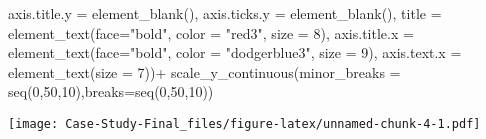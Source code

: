 \documentclass[
]{article}
\newenvironment{Shaded}{\begin{snugshade}}{\end{snugshade}}
\newcommand{\AttributeTok}[1]{\textcolor[rgb]{0.77,0.63,0.00}{#1}}
\newcommand{\DecValTok}[1]{\textcolor[rgb]{0.00,0.00,0.81}{#1}}
\newcommand{\FunctionTok}[1]{\textcolor[rgb]{0.00,0.00,0.00}{#1}}
\newcommand{\NormalTok}[1]{#1}
\newcommand{\SpecialCharTok}[1]{\textcolor[rgb]{0.00,0.00,0.00}{#1}}
\newcommand{\StringTok}[1]{\textcolor[rgb]{0.31,0.60,0.02}{#1}}
\begin{document}
\begin{Shaded}
\begin{Highlighting}[]
        \AttributeTok{axis.title.y =} \FunctionTok{element\_blank}\NormalTok{(),}
        \AttributeTok{axis.ticks.y =} \FunctionTok{element\_blank}\NormalTok{(),}
        \AttributeTok{title =} \FunctionTok{element\_text}\NormalTok{(}\AttributeTok{face=}\StringTok{"bold"}\NormalTok{, }\AttributeTok{color =} \StringTok{"red3"}\NormalTok{, }\AttributeTok{size =} \DecValTok{8}\NormalTok{),}
        \AttributeTok{axis.title.x =} \FunctionTok{element\_text}\NormalTok{(}\AttributeTok{face=}\StringTok{"bold"}\NormalTok{, }\AttributeTok{color =} \StringTok{"dodgerblue3"}\NormalTok{, }\AttributeTok{size =} \DecValTok{9}\NormalTok{),}
        \AttributeTok{axis.text.x =} \FunctionTok{element\_text}\NormalTok{(}\AttributeTok{size =} \DecValTok{7}\NormalTok{))}\SpecialCharTok{+}
  \FunctionTok{scale\_y\_continuous}\NormalTok{(}\AttributeTok{minor\_breaks =} \FunctionTok{seq}\NormalTok{(}\DecValTok{0}\NormalTok{,}\DecValTok{50}\NormalTok{,}\DecValTok{10}\NormalTok{),}\AttributeTok{breaks=}\FunctionTok{seq}\NormalTok{(}\DecValTok{0}\NormalTok{,}\DecValTok{50}\NormalTok{,}\DecValTok{10}\NormalTok{))}
\end{Highlighting}
\end{Shaded}

\texttt{[image: Case-Study-Final\_files/figure-latex/unnamed-chunk-4-1.pdf]}
\end{document}
